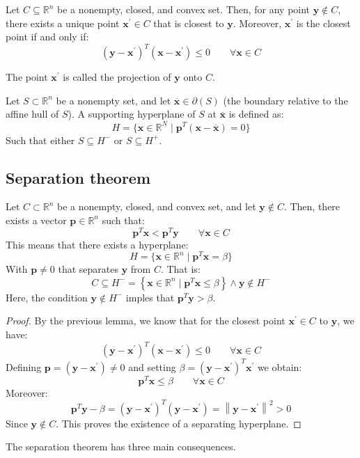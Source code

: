 \begin{lemma}
    Let $C \subseteq \mathbb{R}^n$ be a nonempty, closed, and convex set.
    Then, for any point $\mathbf{y} \notin C$, there exists a unique point $\mathbf{x}^\prime\in  C$ that is closest to $\mathbf{y}$.
    Moreover, $\mathbf{x}^\prime$ is the closest point if and only if:
    \[(\mathbf{y}- \mathbf{x}^\prime)^T(\mathbf{x} - \mathbf{x}^\prime) \leq 0 \qquad \forall \mathbf{x} \in  C\]
\end{lemma}

\begin{definition}
    The point $\mathbf{x}^\prime$  is called the projection of $\mathbf{y}$ onto $C$.
\end{definition}

\begin{definition}
    Let $S\subset\mathbb{R}^n$ be a nonempty set, and let $\overline{\mathbf{x}}\in\partial(S)$  (the boundary relative to the affine hull of $S$). 
    A supporting hyperplane of $S$ at $\overline{\mathbf{x}}$ is defined as:
    \[H=\{\mathbf{x}\in\mathbb{R}^N\mid\mathbf{p}^T(\mathbf{x}-\overline{\mathbf{x}})=0\}\]
    Such that either $S\subseteq H^{-}$ or $S\subseteq H^{+}$.  
\end{definition}

\subsection{Separation theorem}
\begin{theorem}
    Let $C \subset\mathbb{R}^n$ be a nonempty, closed, and convex set, and let $\mathbf{y} \notin  C$. 
    Then, there exists a vector $\mathbf{p} \in \mathbb{R}^n$ such that:
    \[\mathbf{p}^T\mathbf{x} < \mathbf{p}^T\mathbf{y} \qquad\forall\mathbf{x} \in  C\]
    This means that there exists a hyperplane: 
    \[H = \{\mathbf{x} \in  \mathbb{R}^n\mid \mathbf{p}^T\mathbf{x} = \beta\}\] 
    With $\mathbf{p} \neq 0$ that separates $\mathbf{y}$ from $C$. 
    That is:
    \[C \subseteq H^{-} = \left\{\mathbf{x} \in  \mathbb{R}^n\mid \mathbf{p}^T\mathbf{x} \leq \beta\right\} \land \mathbf{y} \notin  H^{-}\]
    Here, the condition $\mathbf{y} \notin  H^{-}$ imples that $\mathbf{p}^T\mathbf{y} > \beta$. 
\end{theorem}
\begin{proof}
    By the previous lemma, we know that for the closest point $\mathbf{x}^\prime\in C$ to $\mathbf{y}$, we have:
    \[(\mathbf{y} - \mathbf{x}^\prime)^T(\mathbf{x} - \mathbf{x}^\prime) \leq 0\qquad \forall \mathbf{x} \in  C\]
    Defining $\mathbf{p} = (\mathbf{y}-\mathbf{x}^\prime) \neq 0$  and setting $\beta = (\mathbf{y}- \mathbf{x}^\prime)^T\mathbf{x}^\prime$ we obtain: 
    \[\mathbf{p}^T\mathbf{x}\leq\beta\qquad\forall\mathbf{x} \in  C\]
    Moreover: 
    \[\mathbf{p}^T\mathbf{y} -\beta = (\mathbf{y} - \mathbf{x}^\prime)^T(\mathbf{y}-\mathbf{x}^\prime) = {\left\lVert \mathbf{y} -\mathbf{x}^\prime\right\rVert}^2 > 0\]  
    Since $\mathbf{y} \notin  C$.
    This proves the existence of a separating hyperplane.
\end{proof}
The separation theorem has three main consequences. 


